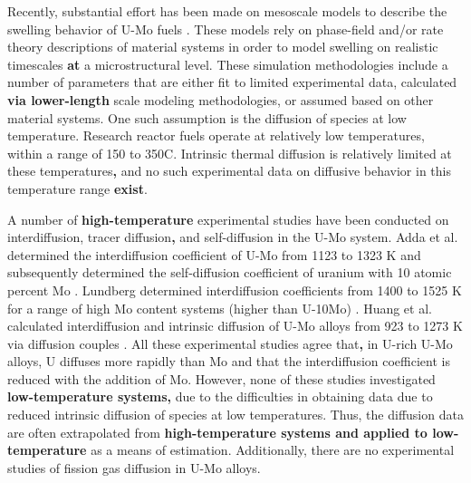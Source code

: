 \documentclass[review]{elsarticle}
\providecommand{\DIFaddtex}[1]{{\bf #1}} %
\providecommand{\DIFdeltex}[1]{} %
\providecommand{\DIFaddbegin}{\protect\color{blue}} %
\providecommand{\DIFaddend}{\protect\color{black}} %
\providecommand{\DIFdelbegin}{\protect\color{red}} %
\providecommand{\DIFdelend}{\protect\color{black}} %
\providecommand{\DIFadd}[1]{\texorpdfstring{\DIFaddtex{#1}}{#1}} %
\providecommand{\DIFdel}[1]{\texorpdfstring{\DIFdeltex{#1}}{}} %
\newcommand{\DIFscaledelfig}{0.5}
\newlength{\DIFdelgraphicswidth} %
\newlength{\DIFdelgraphicsheight} %
\newcommand{\DIFaddincludegraphics}[2][]{{\color{blue}\fbox{\DIFOincludegraphics[#1]{#2}}}} %
\newcommand{\DIFdelincludegraphics}[2][]{%
\sbox{\DIFdelgraphicsbox}{\DIFOincludegraphics[#1]{#2}}%
\settoboxwidth{\DIFdelgraphicswidth}{\DIFdelgraphicsbox} %
\settoboxtotalheight{\DIFdelgraphicsheight}{\DIFdelgraphicsbox} %
\scalebox{\DIFscaledelfig}{%
\parbox[b]{\DIFdelgraphicswidth}{\usebox{\DIFdelgraphicsbox}\\[-\baselineskip] \rule{\DIFdelgraphicswidth}{0em}}\llap{\resizebox{\DIFdelgraphicswidth}{\DIFdelgraphicsheight}{%
\setlength{\unitlength}{\DIFdelgraphicswidth}%
\begin{picture}(1,1)%
\thicklines\linethickness{2pt} %
{\color[rgb]{1,0,0}\put(0,0){\framebox(1,1){}}}%
{\color[rgb]{1,0,0}\put(0,0){\line( 1,1){1}}}%
{\color[rgb]{1,0,0}\put(0,1){\line(1,-1){1}}}%
\end{picture}%
}\hspace*{3pt}}} %
} %
\DeclareRobustCommand{\DIFaddbegin}{\DIFOaddbegin \let\includegraphics\DIFaddincludegraphics} %
\DeclareRobustCommand{\DIFaddend}{\DIFOaddend \let\includegraphics\DIFOincludegraphics} %
\DeclareRobustCommand{\DIFdelbegin}{\DIFOdelbegin \let\includegraphics\DIFdelincludegraphics} %
\DeclareRobustCommand{\DIFdelend}{\DIFOaddend \let\includegraphics\DIFOincludegraphics} %
\begin{document}
Recently, substantial effort has been made on mesoscale models to describe the swelling behavior of U-Mo fuels \cite{liang2018, liang2018a, liang2017, liang2016, ye2018, hu2017a, hu2016, hu2016a}. These models rely on phase-field and/or rate theory descriptions of material systems in order to model swelling on realistic timescales \DIFdelbegin \DIFdel{on }\DIFdelend \DIFaddbegin \DIFadd{at }\DIFaddend a microstructural level. These simulation methodologies include a number of parameters that are either fit to limited experimental data, calculated \DIFdelbegin \DIFdel{from lower length }\DIFdelend \DIFaddbegin \DIFadd{via lower-length }\DIFaddend scale modeling methodologies, or assumed based on other material systems. One such assumption is the diffusion of species at low temperature. Research reactor fuels operate at relatively low temperatures, within a range of 150 \DIFdelbegin %
\DIFdel{C }\DIFdelend to 350\degree C. Intrinsic \DIFdelbegin \DIFdel{, }\DIFdelend thermal diffusion is relatively limited at these temperatures\DIFaddbegin \DIFadd{, }\DIFaddend and no such experimental data on diffusive behavior in this temperature range \DIFdelbegin \DIFdel{exists}\DIFdelend \DIFaddbegin \DIFadd{exist}\DIFaddend . 

A number of \DIFdelbegin \DIFdel{high temperature }\DIFdelend \DIFaddbegin \DIFadd{high-temperature }\DIFaddend experimental studies have been conducted on interdiffusion, tracer diffusion\DIFaddbegin \DIFadd{, }\DIFaddend and self-diffusion in the U-Mo system. Adda \DIFdelbegin \DIFdel{, }\DIFdelend et al. determined the interdiffusion coefficient of U-Mo from 1123 \DIFdelbegin \DIFdel{K }\DIFdelend to 1323 K and subsequently determined the self-diffusion coefficient of uranium with 10 atomic percent Mo \cite{adda1962}. Lundberg determined interdiffusion coefficients from 1400 \DIFdelbegin \DIFdel{K }\DIFdelend to 1525 K for a range of high Mo content systems (higher than U-10Mo) \cite{lundberg1989}. Huang \DIFdelbegin \DIFdel{, }\DIFdelend et al. calculated interdiffusion and intrinsic diffusion of U-Mo alloys from 923 \DIFdelbegin \DIFdel{K }\DIFdelend to 1273 K via diffusion couples \cite{huang2013}. All \DIFdelbegin \DIFdel{of }\DIFdelend these experimental studies agree that\DIFaddbegin \DIFadd{, }\DIFaddend in U-rich U-Mo alloys, U diffuses more rapidly than Mo and that the interdiffusion coefficient is reduced with the addition of Mo. However, none of these studies investigated \DIFdelbegin \DIFdel{low temperature systems}\DIFdelend \DIFaddbegin \DIFadd{low-temperature systems, }\DIFaddend due to the difficulties in obtaining data due to reduced intrinsic diffusion of species at low temperatures. Thus, the diffusion data are often extrapolated from \DIFdelbegin \DIFdel{high temperature systems to low temperature }\DIFdelend \DIFaddbegin \DIFadd{high-temperature systems and applied to low-temperature }\DIFaddend as a means of estimation. Additionally, there are no experimental studies of fission gas diffusion in U-Mo alloys. 
\end{document}
